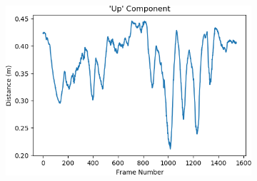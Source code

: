 \begin{figure}
    \centering
    \begin{subfigure}[b]{0.49\textwidth}
         \centering
         \includegraphics[width=\textwidth]{images/bundles.csv_figure_u}
    \end{subfigure}


\end{figure}
